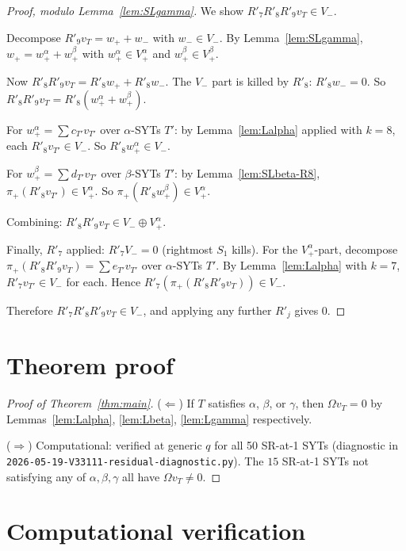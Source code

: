\documentclass[11pt]{article}
\newcommand{\Vm}{V_{-}}
\newcommand{\Vpalpha}{V_{+}^{\alpha}}
\newcommand{\Vpbeta}{V_{+}^{\beta}}
\begin{document}
\begin{proof}[Proof, modulo Lemma~\ref{lem:SLgamma}]
We show $R'_7 R'_8 R'_9 v_T \in \Vm$.

Decompose $R'_9 v_T = w_+ + w_-$ with $w_- \in \Vm$. By Lemma~\ref{lem:SLgamma},
$w_+ = w_+^\alpha + w_+^\beta$ with $w_+^\alpha \in \Vpalpha$ and $w_+^\beta
\in \Vpbeta$.

Now $R'_8 R'_9 v_T = R'_8 w_+ + R'_8 w_-$. The $\Vm$ part is killed by $R'_8$:
$R'_8 w_- = 0$. So $R'_8 R'_9 v_T = R'_8 (w_+^\alpha + w_+^\beta)$.

For $w_+^\alpha = \sum c_{T'} v_{T'}$ over $\alpha$-SYTs $T'$: by Lemma~\ref{lem:Lalpha}
applied with $k=8$, each $R'_8 v_{T'} \in \Vm$. So $R'_8 w_+^\alpha \in \Vm$.

For $w_+^\beta = \sum d_{T'} v_{T'}$ over $\beta$-SYTs $T'$: by Lemma~\ref{lem:SLbeta-R8},
$\pi_+(R'_8 v_{T'}) \in \Vpalpha$. So $\pi_+(R'_8 w_+^\beta) \in \Vpalpha$.

Combining: $R'_8 R'_9 v_T \in \Vm \oplus \Vpalpha$.

Finally, $R'_7$ applied: $R'_7 \Vm = 0$ (rightmost $S_1$ kills). For the
$\Vpalpha$-part, decompose $\pi_+(R'_8 R'_9 v_T) = \sum e_{T'} v_{T'}$ over
$\alpha$-SYTs $T'$. By Lemma~\ref{lem:Lalpha} with $k=7$, $R'_7 v_{T'} \in \Vm$
for each. Hence $R'_7 (\pi_+(R'_8 R'_9 v_T)) \in \Vm$.

Therefore $R'_7 R'_8 R'_9 v_T \in \Vm$, and applying any further $R'_j$ gives 0.
\end{proof}

\section{Theorem proof}

\begin{proof}[Proof of Theorem~\ref{thm:main}]
($\Leftarrow$) If $T$ satisfies $\alpha$, $\beta$, or $\gamma$, then $\Omega v_T = 0$ by
Lemmas~\ref{lem:Lalpha}, \ref{lem:Lbeta}, \ref{lem:Lgamma} respectively.

($\Rightarrow$) Computational: verified at generic $q$ for all 50 SR-at-1 SYTs
(diagnostic in \texttt{2026-05-19-V33111-residual-diagnostic.py}). The
$15$ SR-at-1 SYTs not satisfying any of $\alpha, \beta, \gamma$ all have
$\Omega v_T \ne 0$.
\end{proof}

\section{Computational verification}
\end{document}
